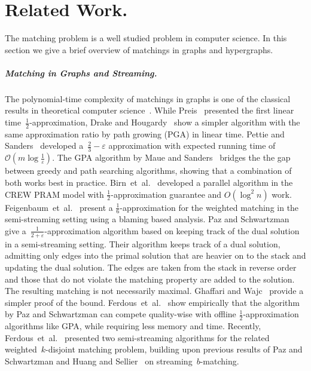 \section{Related Work.}
The matching problem is a well studied problem in computer science.
 In this section we give a brief overview of matchings in graphs and hypergraphs.
\subparagraph{Matching in Graphs and Streaming.}
The polynomial-time complexity of matchings in graphs is one of the classical results in theoretical computer science~\cite{edmonds_1965}.
While Preis~\cite{preis1999linear} presented the first linear time~$\frac{1}{2}$-approximation, Drake and Hougardy~\cite{drake2003simple} show a simpler algorithm with the same approximation ratio by path growing (PGA) in linear time. 
 Pettie and Sanders~\cite{PETTIE2004271} developed a~$\frac{2}{3}-\varepsilon$ approximation with expected running time of~$\mathcal{O}(m\log \frac{1}{\varepsilon})$.
 The GPA algorithm by Maue and Sanders~\cite{maue2007engineering} bridges the the gap between greedy and path searching algorithms, showing that a combination of both works best in practice.
 Birn~et~al.~\cite{birn2013efficient} developed a parallel algorithm in the CREW PRAM model with $\frac{1}{2}$-approximation guarantee and $O(\log^2n)$ work.
Feigenbaum~et~al.~\cite{feigenbaum2005graph} present a $\frac{1}{6}$-approximation for the weighted matching in  the semi-streaming setting using a blaming based analysis.
Paz and Schwartzman~\cite{10.1145/3274668} give a~$\frac{1}{2+\varepsilon}$-approximation algorithm based on  keeping track of the dual solution in a semi-streaming setting.
Their algorithm keeps track of a dual solution, admitting only edges into the primal solution that are heavier on to the stack and updating the dual solution.
 The edges are taken from the stack in reverse order and those that do not violate the matching property are added to the solution.
 The resulting matching is not necessarily maximal.
 Ghaffari and Wajc~\cite{ghaffari2017simplified} provide a simpler proof of the bound.
 Ferdous~et~al.~\cite{ferdous_et_al:LIPIcs.SEA.2024.12} show empirically that the algorithm by Paz and Schwartzman can compete quality-wise with offline $\frac{1}{2}$-approximation algorithms like GPA, while requiring less memory and time.
Recently, Ferdous~et~al.~\cite{ferdous2023streaming} presented two semi-streaming algorithms for the related weighted~$k$-disjoint matching problem, building upon previous results of  Paz and Schwartzman and Huang and Sellier~\cite{10.1145/3274668, huang_et_al:LIPIcs.APPROX/RANDOM.2021.14} on streaming~$b$-matching.

